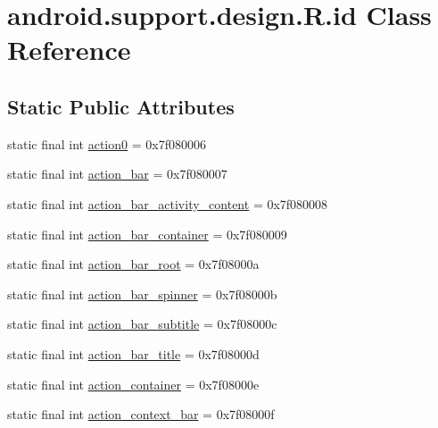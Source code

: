 \hypertarget{classandroid_1_1support_1_1design_1_1R_1_1id}{}\section{android.\+support.\+design.\+R.\+id Class Reference}
\label{classandroid_1_1support_1_1design_1_1R_1_1id}
\subsection*{Static Public Attributes}
\begin{DoxyCompactItemize}
\item 
static final int \mbox{\hyperlink{classandroid_1_1support_1_1design_1_1R_1_1id_a65ca78d6559d5c73324d48f61d2af87e}{action0}} = 0x7f080006
\item 
static final int \mbox{\hyperlink{classandroid_1_1support_1_1design_1_1R_1_1id_a244052aff1f9058e9de1c6c346d3843e}{action\+\_\+bar}} = 0x7f080007
\item 
static final int \mbox{\hyperlink{classandroid_1_1support_1_1design_1_1R_1_1id_ad64ccac77799d29737c02c55d580556d}{action\+\_\+bar\+\_\+activity\+\_\+content}} = 0x7f080008
\item 
static final int \mbox{\hyperlink{classandroid_1_1support_1_1design_1_1R_1_1id_a61d2f497f300510b00f9f341cfb3c078}{action\+\_\+bar\+\_\+container}} = 0x7f080009
\item 
static final int \mbox{\hyperlink{classandroid_1_1support_1_1design_1_1R_1_1id_a8601162f3d020a91d67ad13ba68f61d9}{action\+\_\+bar\+\_\+root}} = 0x7f08000a
\item 
static final int \mbox{\hyperlink{classandroid_1_1support_1_1design_1_1R_1_1id_aef2b62b7a707c8bcf579d09add314db0}{action\+\_\+bar\+\_\+spinner}} = 0x7f08000b
\item 
static final int \mbox{\hyperlink{classandroid_1_1support_1_1design_1_1R_1_1id_a9d10452d08435f3bd9519b8254b65800}{action\+\_\+bar\+\_\+subtitle}} = 0x7f08000c
\item 
static final int \mbox{\hyperlink{classandroid_1_1support_1_1design_1_1R_1_1id_a8f869c4a3c2a13ce56c526546d038ba0}{action\+\_\+bar\+\_\+title}} = 0x7f08000d
\item 
static final int \mbox{\hyperlink{classandroid_1_1support_1_1design_1_1R_1_1id_ab87867f9ab8c5be2e341414488e0c9aa}{action\+\_\+container}} = 0x7f08000e
\item 
static final int \mbox{\hyperlink{classandroid_1_1support_1_1design_1_1R_1_1id_a37ca1938da776943c7ff7018931ab832}{action\+\_\+context\+\_\+bar}} = 0x7f08000f

\end{DoxyCompactItemize}
